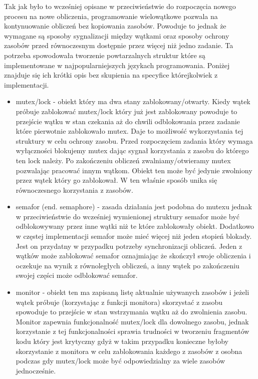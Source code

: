 Tak jak było to wcześniej opisane w przeciwieństwie do rozpoczęcia nowego procesu na nowe obliczenia, programowanie wielowątkowe pozwala na kontynuowanie obliczeń bez kopiowania zasobów. 
Powoduje to jednak że wymagane są sposoby sygnalizacji między wątkami oraz sposoby ochrony zasobów przed równoczesnym dostępnie przez więcej niż jedno zadanie. 
Ta potrzeba spowodowała tworzenie powtarzalnych struktur które są implementowane w najpopularniejszych językach programowania. 
Poniżej znajduje się ich krótki opis bez skupienia na specyfice którejkolwiek z implementacji. 
\begin{itemize}
        \item mutex/lock - obiekt który ma dwa stany zablokowany/otwarty.
        Kiedy wątek próbuje zablokować mutex/lock który już jest zablokowany powoduje to przejście wątku w stan czekania aż do chwili odblokowania przez zadanie które pierwotnie zablokowało mutex.
        Daje to możliwość wykorzystania tej struktury w celu ochrony zasobu. Przed rozpoczęciem zadania który wymaga wyłączności blokujemy mutex dając sygnał korzystania z zasobu do którego ten lock należy. 
        Po zakończeniu obliczeń zwalniamy/otwieramy mutex pozwalając pracować innym wątkom. Obiekt ten może być jedynie zwolniony przez wątek który go zablokował. 
        W ten właśnie sposób unika się równoczesnego korzystania z zasobów. 
        \item semafor (end. semaphore) - zasada działania jest podobna do mutexu jednak w przeciwieństwie do wcześniej wymienionej struktury semafor może być odblokowywany przez inne wątki niż te które zablokowały obiekt. Dodatkowo w częstej implementacji semafor może mieć więcej niż jeden stopień blokady. 
        Jest on przydatny w przypadku potrzeby synchronizacji obliczeń. Jeden z wątków może zablokować semafor oznajmiając że skończył swoje obliczenia i oczekuje na wynik z równoległych obliczeń, a inny wątek po zakończeniu swojej części może odblokować semafor. 
        \item monitor - obiekt ten ma zapisaną listę aktualnie używanych zasobów i jeżeli wątek próbuje (korzystając z funkcji monitora) skorzystać z zasobu spowoduje to przejście w stan wstrzymania wątku aż do zwolnienia zasobu. 
        Monitor zapewnia funkcjonalność mutex/lock dla dowolnego zasobu, jednak korzystanie z tej funkcjonalności sprawia trudności w tworzeniu fragmentów kodu który jest krytyczny gdyż w takim przypadku konieczne byłoby skorzystanie z monitora w celu zablokowania każdego z zasobów z osobna podczas gdy mutex/lock może być odpowiedzialny za wiele zasobów jednocześnie.   
\end{itemize} 

